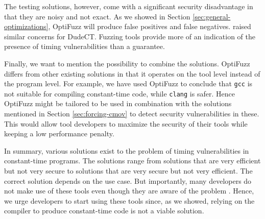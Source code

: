 The testing solutions, however, come with a significant security disadvantage in that they are noisy and not exact.
As we showed in Section \ref{sec:general-optimizations}, OptiFuzz will produce false positives and false negatives.
\citeauthor{dudect} raised similar concerns for DudeCT.
Fuzzing tools provide more of an indication of the presence of timing vulnerabilities than a guarantee.

Finally, we want to mention the possibility to combine the solutions.
OptiFuzz differs from other existing solutions in that it operates on the tool level instead of the program level.
For example, we have used OptiFuzz to conclude that \texttt{gcc} is not suitable for compiling constant-time code, while \texttt{clang} is safer.
Hence OptiFuzz might be tailored to be used in combination with the solutions mentioned in Section \ref{sec:forcing-cmov} to detect security vulnerabilities in these.
This would allow tool developers to maximize the security of their tools while keeping a low performance penalty.

In summary, various solutions exist to the problem of timing vulnerabilities in constant-time programs.
The solutions range from solutions that are very efficient but not very secure to solutions that are very secure but not very efficient.
The correct solution depends on the use case.
But importantly, many developers do not make use of these tools even though they are aware of the problem \citep{developer-survey-timing-attacks}.
Hence, we urge developers to start using these tools since, as we showed, relying on the compiler to produce constant-time code is not a viable solution.